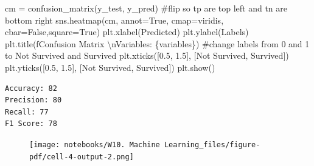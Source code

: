\documentclass[
  letterpaper,
  DIV=11,
  numbers=noendperiod]{scrreprt}
\newenvironment{Shaded}{\begin{snugshade}}{\end{snugshade}}
\newcommand{\CharTok}[1]{\textcolor[rgb]{0.13,0.47,0.30}{#1}}
\newcommand{\CommentTok}[1]{\textcolor[rgb]{0.37,0.37,0.37}{#1}}
\newcommand{\FloatTok}[1]{\textcolor[rgb]{0.68,0.00,0.00}{#1}}
\newcommand{\NormalTok}[1]{\textcolor[rgb]{0.00,0.23,0.31}{#1}}
\newcommand{\OperatorTok}[1]{\textcolor[rgb]{0.37,0.37,0.37}{#1}}
\newcommand{\SpecialCharTok}[1]{\textcolor[rgb]{0.37,0.37,0.37}{#1}}
\newcommand{\SpecialStringTok}[1]{\textcolor[rgb]{0.13,0.47,0.30}{#1}}
\newcommand{\StringTok}[1]{\textcolor[rgb]{0.13,0.47,0.30}{#1}}
\newcommand{\VariableTok}[1]{\textcolor[rgb]{0.07,0.07,0.07}{#1}}
\begin{document}
\begin{Shaded}
\begin{Highlighting}[]
\NormalTok{cm }\OperatorTok{=}\NormalTok{ confusion\_matrix(y\_test, y\_pred)}
\CommentTok{\#flip so tp are top left and tn are bottom right}
\NormalTok{sns.heatmap(cm, annot}\OperatorTok{=}\VariableTok{True}\NormalTok{, cmap}\OperatorTok{=}\StringTok{\textquotesingle{}viridis\textquotesingle{}}\NormalTok{, cbar}\OperatorTok{=}\VariableTok{False}\NormalTok{,square}\OperatorTok{=}\VariableTok{True}\NormalTok{)}
\NormalTok{plt.xlabel(}\StringTok{\textquotesingle{}Predicted\textquotesingle{}}\NormalTok{)}
\NormalTok{plt.ylabel(}\StringTok{\textquotesingle{}Labels\textquotesingle{}}\NormalTok{)}
\NormalTok{plt.title(}\SpecialStringTok{f\textquotesingle{}Confusion Matrix }\CharTok{\textbackslash{}n}\SpecialStringTok{Variables: }\SpecialCharTok{\{}\NormalTok{variables}\SpecialCharTok{\}}\SpecialStringTok{\textquotesingle{}}\NormalTok{)}
\CommentTok{\#change labels from 0 and 1 to \textquotesingle{}Not Survived\textquotesingle{} and \textquotesingle{}Survived\textquotesingle{}}
\NormalTok{plt.xticks([}\FloatTok{0.5}\NormalTok{, }\FloatTok{1.5}\NormalTok{], [}\StringTok{\textquotesingle{}Not Survived\textquotesingle{}}\NormalTok{, }\StringTok{\textquotesingle{}Survived\textquotesingle{}}\NormalTok{])}
\NormalTok{plt.yticks([}\FloatTok{0.5}\NormalTok{, }\FloatTok{1.5}\NormalTok{], [}\StringTok{\textquotesingle{}Not Survived\textquotesingle{}}\NormalTok{, }\StringTok{\textquotesingle{}Survived\textquotesingle{}}\NormalTok{])}
\NormalTok{plt.show()}
\end{Highlighting}
\end{Shaded}

\begin{verbatim}
Accuracy: 82
Precision: 80
Recall: 77
F1 Score: 78
\end{verbatim}

\begin{figure}[H]

{\centering \texttt{[image: notebooks/W10. Machine Learning\_files/figure-pdf/cell-4-output-2.png]}

}

\end{figure}
\end{document}
